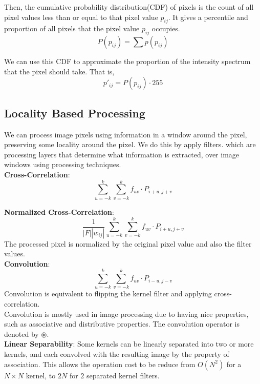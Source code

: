 \documentclass[12pt]{article}
\begin{document}
Then, the cumulative probability distribution(CDF) of pixels is the count of all pixel values less than or equal to that pixel value $p_{ij}$. It gives a percentile and proportion of all pixels that the pixel value $p_{ij}$ occupies. 
\begin{equation}
P(p_{ij}) = \sum p(p_{ij})
\end{equation}

We can use this CDF to approximate the proportion of the intensity spectrum that the pixel should take. That is,
\begin{equation}
p'_{ij} = P(p_{ij}) \cdot 255
\end{equation}

\subsection{Locality Based Processing}

We can process image pixels using information in a window around the pixel, preserving some locality around the pixel. We do this by apply filters. which are processing layers that determine what information is extracted, over image windows using processing techniques.\\

\textbf{Cross-Correlation}: 
\begin{equation}
\sum^k_{u = -k} \sum^k_{v = -k} f_{uv} \cdot P_{i + u, j + v}
\end{equation}

\textbf{Normalized Cross-Correlation}: 
\begin{equation}
\frac{1}{|F||w_{ij}|}\sum^k_{u = -k} \sum^k_{v = -k} f_{uv} \cdot P_{i + u, j + v}
\end{equation}
The processed pixel is normalized by the original pixel value and also the filter values.\\

\textbf{Convolution}: 
\begin{equation}
\sum^k_{u = -k} \sum^k_{v = -k} f_{uv} \cdot P_{i - u, j - v} 
\end{equation}
Convolution is equivalent to flipping the kernel filter and applying cross-correlation. \\
Convolution is mostly used in image processing due to having nice properties, such as associative and distributive properties. The convolution operator is denoted by $\circledast$. \\

\textbf{Linear Separability}: Some kernels can be linearly separated into two or more kernels, and each convolved with the resulting image by the property of association. This allows the operation cost to be reduce from $O(N^2)$ for a $N \times N$ kernel, to $2N$ for $2$ separated kernel filters.
\end{document}
